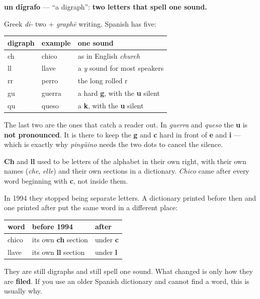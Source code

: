 \begin{cousinweb}
\textbf{un dígrafo} — \textquotedblleft{}a digraph\textquotedblright{}: \textbf{two letters that spell one sound.}

Greek \emph{di-} two + \emph{graphē} writing. Spanish has five:

\noindent
\begin{tabularx}{\linewidth}{@{}>{\raggedright\arraybackslash}X>{\raggedright\arraybackslash}X>{\raggedright\arraybackslash}X@{}}
\toprule
\textbf{digraph} & \textbf{example} & \textbf{one sound} \\
\midrule
ch & chico & as in English \emph{church} \\
ll & llave & a \emph{y} sound for most speakers \\
rr & perro & the long rolled r \\
gu & guerra & a hard \textbf{g}, with the \textbf{u} silent \\
qu & queso & a \textbf{k}, with the \textbf{u} silent \\
\bottomrule
\end{tabularx}

The last two are the ones that catch a reader out. In \emph{guerra} and \emph{queso} the \textbf{u} is \textbf{not pronounced}. It is there to keep the \textbf{g} and \textbf{c} hard in front of \textbf{e} and \textbf{i} — which is exactly why \emph{pingüino} needs the two dots to cancel the silence.
\end{cousinweb}

\begin{grammarlens}[title={Grammar Lens: the 1994 change, and why a dictionary moved}]
\textbf{Ch} and \textbf{ll} used to be letters of the alphabet in their own right, with their own names (\emph{che}, \emph{elle}) and their own sections in a dictionary. \emph{Chico} came after every word beginning with \textbf{c}, not inside them.

In 1994 they stopped being separate letters. A dictionary printed before then and one printed after put the same word in a different place:

\noindent
\begin{tabularx}{\linewidth}{@{}>{\raggedright\arraybackslash}X>{\raggedright\arraybackslash}X>{\raggedright\arraybackslash}X@{}}
\toprule
\textbf{word} & \textbf{before 1994} & \textbf{after} \\
\midrule
chico & its own \textbf{ch} section & under \textbf{c} \\
llave & its own \textbf{ll} section & under \textbf{l} \\
\bottomrule
\end{tabularx}

They are still digraphs and still spell one sound. What changed is only how they are \textbf{filed}. If you use an older Spanish dictionary and cannot find a word, this is usually why.
\end{grammarlens}

